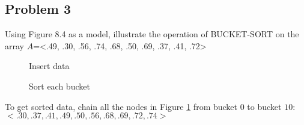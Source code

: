 \documentclass[a4paper]{article}
\makeatletter
\def\LinkedList#1{%
  \foreach \element in \list {
     \node[node of list, right = of aux, name=ele] {\element};
     \draw[link] (aux) -- (ele);
     \coordinate (aux) at (ele.east);
  }
}
\newenvironment{solution}
  {\begin{proof}[Solution]}
  {\end{proof}}
\renewenvironment{proof}[1][\proofname]{%
  \par\pushQED{\qed}\normalfont%
  \topsep6\p@\@plus6\p@\relax
  \trivlist\item[\hskip\labelsep\bfseries#1\@addpunct{.}]%
  \ignorespaces
}{%
  \popQED\endtrivlist\@endpefalse
}
\makeatother
\begin{document}
\subsection*{Problem 3}
Using Figure 8.4 as a model, illustrate the operation of BUCKET-SORT on the array $A$=<.49, .30, .56, .74, .68, .50, .69, .37, .41, .72>
\begin{figure}[H]
\centering
\begin{minipage}{5cm}
\caption{Insert data}
\end{minipage}
\qquad
\begin{minipage}{5cm}
\caption{Sort each bucket}
\label{bucket}
\end{minipage}
\end{figure}

\begin{solution}
To get sorted data, chain all the nodes in Figure \ref{bucket} from bucket $0$ to bucket $10$: \\
$<.30, .37, .41, .49, .50, .56, .68, .69, .72, .74>$
\end{solution}
\end{document}

